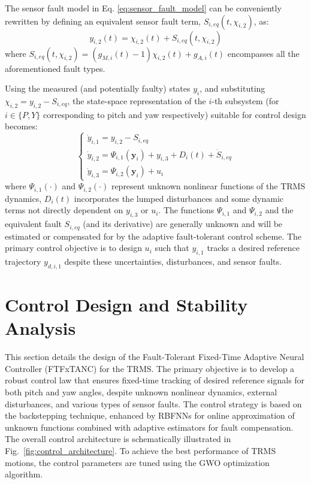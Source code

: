 The sensor fault model in Eq. \eqref{eq:sensor_fault_model} can be conveniently rewritten by defining an equivalent sensor fault term, $S_{i,eq}(t, \chi_{i,2})$, as:
\begin{equation}
    \label{eq:equivalent_fault}
    y_{i,2}(t) = \chi_{i,2}(t) + S_{i,eq}(t, \chi_{i,2})
\end{equation}
where $S_{i,eq}(t, \chi_{i,2}) = (g_{M,i}(t)-1)\chi_{i,2}(t) + g_{A,i}(t)$ encompasses all the aforementioned fault types.

Using the measured (and potentially faulty) states $y_i$, and substituting $\chi_{i,2} = y_{i,2} - S_{i,eq}$, the state-space representation of the $i$-th subsystem (for $i \in \{P,Y\}$ corresponding to pitch and yaw respectively) suitable for control design becomes:
\begin{equation}
    \label{eq:system_for_control_design}
    \begin{cases}
        \dot{y}_{i,1} = y_{i,2} - S_{i,eq} \\
        \dot{y}_{i,2} = \Psi_{i,1}(\mathbf{y}_i) + y_{i,3} + D_i(t) + \dot{S}_{i,eq} \\
        \dot{y}_{i,3} = \Psi_{i,2}(\mathbf{y}_i) + u_i
    \end{cases}
\end{equation}
where $\Psi_{i,1}(\cdot)$ and $\Psi_{i,2}(\cdot)$ represent unknown nonlinear functions of the TRMS dynamics, $D_i(t)$ incorporates the lumped disturbances and some dynamic terms not directly dependent on $y_{i,3}$ or $u_i$. The functions $\Psi_{i,1}$ and $\Psi_{i,2}$ and the equivalent fault $S_{i,eq}$ (and its derivative) are generally unknown and will be estimated or compensated for by the adaptive fault-tolerant control scheme. The primary control objective is to design $u_i$ such that $y_{i,1}$ tracks a desired reference trajectory $y_{d,i,1}$ despite these uncertainties, disturbances, and sensor faults.

\section{Control Design and Stability Analysis}
\label{sec:trms_control_design}

This section details the design of the Fault-Tolerant Fixed-Time Adaptive Neural Controller (FTFxTANC) for the TRMS. The primary objective is to develop a robust control law that ensures fixed-time tracking of desired reference signals for both pitch and yaw angles, despite unknown nonlinear dynamics, external disturbances, and various types of sensor faults. The control strategy is based on the backstepping technique, enhanced by RBFNNs for online approximation of unknown functions combined with adaptive estimators for fault compensation. The overall control architecture is schematically illustrated in Fig.~\ref{fig:control_architecture}. To achieve the best performance of TRMS motions, the control parameters are tuned using the GWO optimization algorithm.

